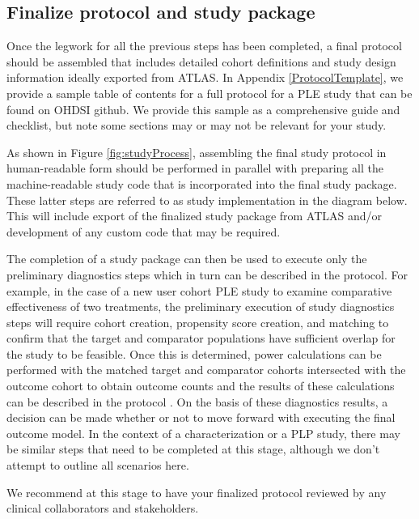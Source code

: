 \documentclass[11pt]{book}
\theoremstyle{definition}
\theoremstyle{definition}
\theoremstyle{definition}
\theoremstyle{remark}
\begin{document}
\hypertarget{finalize-protocol-and-study-package}{%
\subsection{Finalize protocol and study package}\label{finalize-protocol-and-study-package}}

Once the legwork for all the previous steps has been completed, a final protocol should be assembled that includes detailed cohort definitions and study design information ideally exported from ATLAS. In Appendix \ref{ProtocolTemplate}, we provide a sample table of contents for a full protocol for a PLE study that can be found on OHDSI github. We provide this sample as a comprehensive guide and checklist, but note some sections may or may not be relevant for your study.

As shown in Figure \ref{fig:studyProcess}, assembling the final study protocol in human-readable form should be performed in parallel with preparing all the machine-readable study code that is incorporated into the final study package. These latter steps are referred to as study implementation in the diagram below. This will include export of the finalized study package from ATLAS and/or development of any custom code that may be required.

The completion of a study package can then be used to execute only the preliminary diagnostics steps which in turn can be described in the protocol. For example, in the case of a new user cohort PLE study to examine comparative effectiveness of two treatments, the preliminary execution of study diagnostics steps will require cohort creation, propensity score creation, and matching to confirm that the target and comparator populations have sufficient overlap for the study to be feasible. Once this is determined, power calculations can be performed with the matched target and comparator cohorts intersected with the outcome cohort to obtain outcome counts and the results of these calculations can be described in the protocol . On the basis of these diagnostics results, a decision can be made whether or not to move forward with executing the final outcome model. In the context of a characterization or a PLP study, there may be similar steps that need to be completed at this stage, although we don't attempt to outline all scenarios here.

We recommend at this stage to have your finalized protocol reviewed by any clinical collaborators and stakeholders.
\end{document}
